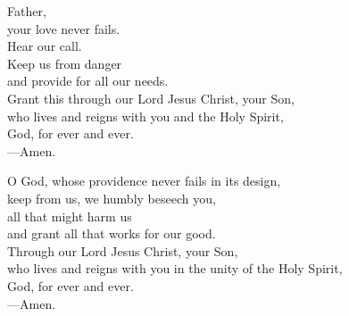 \prayer


\begin{prayerverse}
Father,\\
your love never fails.\\
Hear our call.\\
Keep us from danger\\
and provide for all our needs.\\
Grant this through our Lord Jesus Christ, your Son,\\
who lives and reigns with you and the Holy Spirit,\\
God, for ever and ever.\\
{\color{red}---\thinspace}Amen.
\end{prayerverse}


\begin{prayerverse}
O God, whose providence never fails in its design,\\
keep from us, we humbly beseech you,\\
all that might harm us\\
and grant all that works for our good.\\
Through our Lord Jesus Christ, your Son,\\
who lives and reigns with you in the unity of the Holy Spirit,\\
God, for ever and ever.\\
{\color{red}---\thinspace}Amen.
\end{prayerverse}

